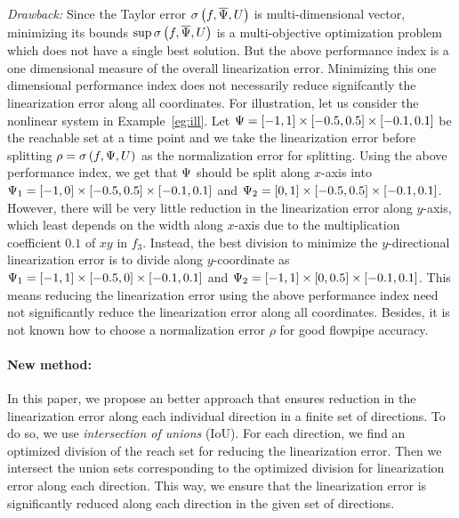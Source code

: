 \emph{Drawback:}  Since the Taylor error
$\sigma\left(f,\overline{\Psi},U\right)$ is multi-dimensional vector, minimizing its
bounds $\sup{\sigma\left(f,\overline{\Psi},U\right)}$ is a multi-objective optimization
problem which does not have a single best solution.  But the above
performance index is a one dimensional measure of the overall
linearization error.  Minimizing this one dimensional performance
index does not necessarily reduce signifcantly the linearization error
along all coordinates.  For illustration, let us consider the
nonlinear system in Example~\ref{eg:ill}.  Let $\Psi =
[-1,1]\times[-0.5,0.5]\times[-0.1,0.1]$ be the reachable set at a time
point and we take the linearization error before splitting $\rho
= \sigma\left(f,\Psi,U\right)$ as the normalization error for splitting.
Using the above performance index, we get that $\Psi$ should be split
along $x$-axis into $\Psi_1 = [-1,0]\times[-0.5,0.5]\times[-0.1,0.1]$
and $\Psi_2 = [0,1]\times[-0.5,0.5]\times[-0.1,0.1]$.  However, there
will be very little reduction in the linearization error along
$y$-axis, which least depends on the width along $x$-axis due to the
multiplication coefficient $0.1$ of $xy$ in $f_3$.  Instead, the best
division to minimize the $y$-directional linearization error is to
divide along $y$-coordinate as $\Psi_1 =
[-1,1]\times[-0.5,0]\times[-0.1,0.1]$ and $\Psi_2 =
[-1,1]\times[0,0.5]\times[-0.1,0.1]$.  This means reducing the
linearization error using the above performance index need not
significantly reduce the linearization error along all coordinates.
Besides, it is not known how to choose a normalization error $\rho$
for good flowpipe accuracy.

\paragraph{New method:}  In this paper, we propose an better approach
that ensures reduction in the linearization error along each
individual direction in a finite set of directions.  To do so, we
use \emph{intersection of unions} (IoU).  For each direction, we find
an optimized division of the reach set for reducing the linearization
error.  Then we intersect the union sets corresponding to the
optimized division for linearization error along each direction.  This
way, we ensure that the linearization error is significantly reduced
along each direction in the given set of directions.

